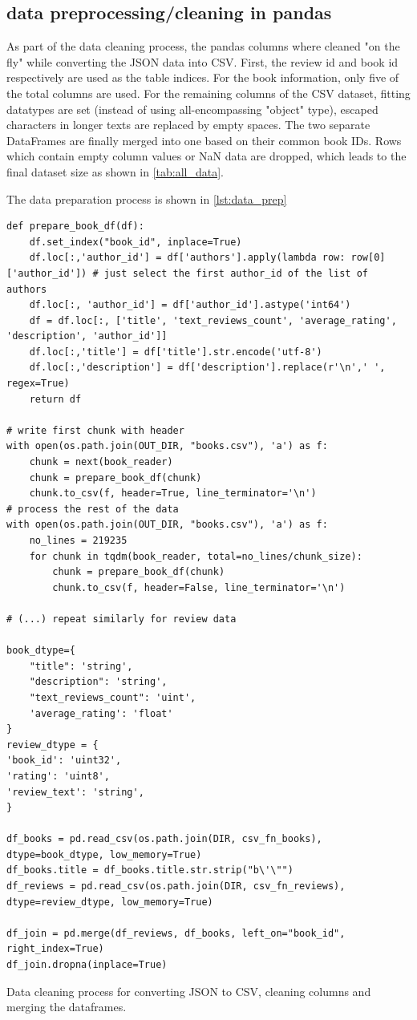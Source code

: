 \documentclass[10pt,final,journal,a4paper,oneside,twocolumn]{IEEEtran}
\begin{document}
\subsection{data preprocessing/cleaning in pandas}
As part of the data cleaning process, the pandas columns where cleaned "on the fly" while converting the JSON data into CSV. First, the review id and book id respectively are used as the table indices. For the book information, only five of the total  columns are used. For the remaining columns of the CSV dataset, fitting datatypes are set (instead of using all-encompassing "object" type), escaped  characters in longer texts are replaced by empty spaces.
The two separate DataFrames are finally merged into one based on their common book IDs. Rows which contain empty column values or NaN data are dropped, which leads to the final dataset size as shown in \autoref{tab:all_data}.

The data preparation process is shown in \autoref{lst:data_prep}

\begin{listing}[h]
    
    \begin{verbatim}
def prepare_book_df(df):
    df.set_index("book_id", inplace=True)
    df.loc[:,'author_id'] = df['authors'].apply(lambda row: row[0]['author_id']) # just select the first author_id of the list of authors
    df.loc[:, 'author_id'] = df['author_id'].astype('int64')
    df = df.loc[:, ['title', 'text_reviews_count', 'average_rating', 'description', 'author_id']]
    df.loc[:,'title'] = df['title'].str.encode('utf-8')
    df.loc[:,'description'] = df['description'].replace(r'\n',' ', regex=True) 
    return df

# write first chunk with header
with open(os.path.join(OUT_DIR, "books.csv"), 'a') as f:
    chunk = next(book_reader)
    chunk = prepare_book_df(chunk)
    chunk.to_csv(f, header=True, line_terminator='\n')  
# process the rest of the data
with open(os.path.join(OUT_DIR, "books.csv"), 'a') as f:
    no_lines = 219235
    for chunk in tqdm(book_reader, total=no_lines/chunk_size):
        chunk = prepare_book_df(chunk)
        chunk.to_csv(f, header=False, line_terminator='\n')

# (...) repeat similarly for review data

book_dtype={
    "title": 'string', 
    "description": 'string', 
    "text_reviews_count": 'uint', 
    'average_rating': 'float'
}
review_dtype = {
'book_id': 'uint32',
'rating': 'uint8',
'review_text': 'string',
}

df_books = pd.read_csv(os.path.join(DIR, csv_fn_books), dtype=book_dtype, low_memory=True)
df_books.title = df_books.title.str.strip("b\'\"") 
df_reviews = pd.read_csv(os.path.join(DIR, csv_fn_reviews), dtype=review_dtype, low_memory=True)

df_join = pd.merge(df_reviews, df_books, left_on="book_id", right_index=True)
df_join.dropna(inplace=True)
    \end{verbatim}
\caption{Data cleaning process for converting JSON to CSV, cleaning columns and merging the dataframes.}
\label{lst:data_prep}
\end{listing}
\end{document}
